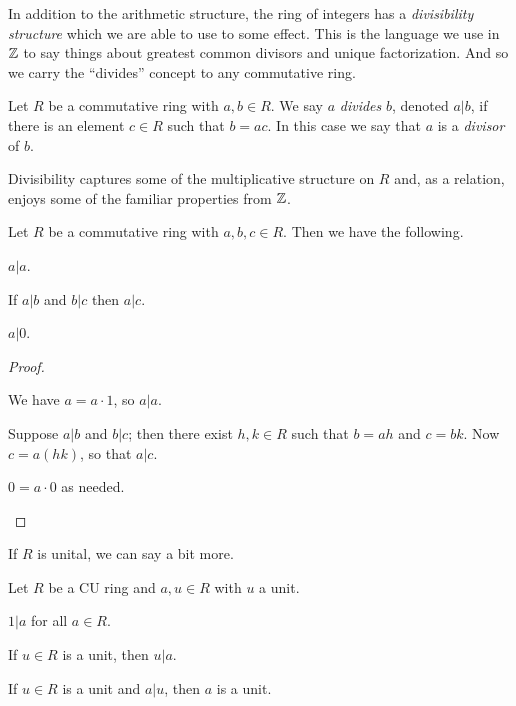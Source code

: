 In addition to the arithmetic structure, the ring of integers has a \emph{divisibility structure} which we are able to use to some effect.
This is the language we use in \(\mathbb{Z}\) to say things about greatest common divisors and unique factorization.
And so we carry the ``divides'' concept to any commutative ring.

\begin{dfn}[Divides] \label{dfn:divides}
Let \(R\) be a commutative ring with \(a,b \in R\).
We say \(a\) \emph{divides} \(b\), denoted \(a|b\), if there is an element \(c \in R\) such that \(b = ac\).
In this case we say that \(a\) is a \emph{divisor} of \(b\).
\end{dfn}

Divisibility captures some of the multiplicative structure on \(R\) and, as a relation, enjoys some of the familiar properties from \(\mathbb{Z}\).

\begin{prop} \label{prop:divides-basics}
Let \(R\) be a commutative ring with \(a,b,c \in R\).
Then we have the following.
\begin{proplist*}
\item \label{prop:divides-basics:refl} \(a|a\).
\item \label{prop:divides-basics:trans} If \(a|b\) and \(b|c\) then \(a|c\).
\item \label{prop:divides-basics:zero} \(a|0\).
\end{proplist*}
\end{prop}

\begin{proof}
\begin{inlineproplist}
\item We have \(a = a \cdot 1\), so \(a|a\).
\item Suppose \(a|b\) and \(b|c\); then there exist \(h,k \in R\) such that \(b = ah\) and \(c = bk\).
Now \(c = a(hk)\), so that \(a|c\).
\item \(0 = a \cdot 0\) as needed.
\end{inlineproplist}
\end{proof}

If \(R\) is unital, we can say a bit more.

\begin{prop} \label{prop:divides-u-basics}
Let \(R\) be a CU ring and \(a,u \in R\) with \(u\) a unit.
\begin{proplist*}
\item \label{prop:divides-u-basics:one} \(1|a\) for all \(a \in R\).
\item \label{prop:divides-u-basics:unit} If \(u \in R\) is a unit, then \(u|a\).
\item \label{prop:divides-u-basics:unit-div} If \(u \in R\) is a unit and \(a|u\), then \(a\) is a unit.
\end{proplist*} 
\end{prop}

